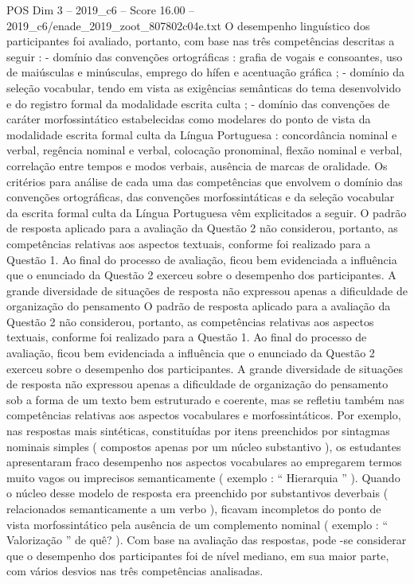 \begin{textsample}{POS Dim 3 – 2019\_c6 – Score 16.00 – 2019\_c6/enade\_2019\_zoot\_807802c04e.txt}
O desempenho linguístico dos participantes foi avaliado, portanto, com base nas três competências descritas a seguir : - domínio das convenções ortográficas : grafia de vogais e consoantes, uso de maiúsculas e minúsculas, emprego do hífen e acentuação gráfica ; - domínio da seleção vocabular, tendo em vista as exigências semânticas do tema desenvolvido e do registro formal da modalidade escrita culta ; - domínio das convenções de caráter morfossintático estabelecidas como modelares do ponto de vista da modalidade escrita formal culta da Língua Portuguesa : concordância nominal e verbal, regência nominal e verbal, colocação pronominal, flexão nominal e verbal, correlação entre tempos e modos verbais, ausência de marcas de oralidade.
Os critérios para análise de cada uma das competências que envolvem o domínio das convenções ortográficas, das convenções morfossintáticas e da seleção vocabular da escrita formal culta da Língua Portuguesa vêm explicitados a seguir.
O padrão de resposta aplicado para a avaliação da Questão 2 não considerou, portanto, as competências relativas aos aspectos textuais, conforme foi realizado para a Questão 1.
Ao final do processo de avaliação, ficou bem evidenciada a influência que o enunciado da Questão 2 exerceu sobre o desempenho dos participantes.
A grande diversidade de situações de resposta não expressou apenas a dificuldade de organização do pensamento O padrão de resposta aplicado para a avaliação da Questão 2 não considerou, portanto, as competências relativas aos aspectos textuais, conforme foi realizado para a Questão 1.
Ao final do processo de avaliação, ficou bem evidenciada a influência que o enunciado da Questão 2 exerceu sobre o desempenho dos participantes.
A grande diversidade de situações de resposta não expressou apenas a dificuldade de organização do pensamento sob a forma de um texto bem estruturado e coerente, mas se refletiu também nas competências relativas aos aspectos vocabulares e morfossintáticos.
Por exemplo, nas respostas mais sintéticas, constituídas por itens preenchidos por sintagmas nominais simples ( compostos apenas por um núcleo substantivo ), os estudantes apresentaram fraco desempenho nos aspectos vocabulares ao empregarem termos muito vagos ou imprecisos semanticamente ( exemplo : “ Hierarquia ” ).
Quando o núcleo desse modelo de resposta era preenchido por substantivos deverbais ( relacionados semanticamente a um verbo ), ficavam incompletos do ponto de vista morfossintático pela ausência de um complemento nominal ( exemplo : “ Valorização ” de quê? ).
Com base na avaliação das respostas, pode -se considerar que o desempenho dos participantes foi de nível mediano, em sua maior parte, com vários desvios nas três competências analisadas.

\end{textsample}
